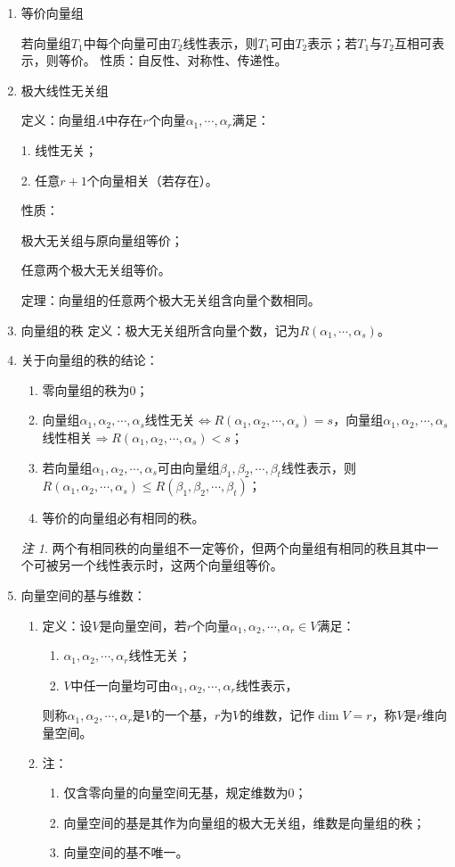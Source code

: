 \documentclass[UTF8]{ctexart}
\theoremstyle{remark}
\newtheorem{remark}{注}
\begin{document}
\begin{enumerate}
\item 等价向量组  

若向量组\(T_1\)中每个向量可由\(T_2\)线性表示，则\(T_1\)可由\(T_2\)表示；若\(T_1\)与\(T_2\)互相可表示，则等价。  
性质：自反性、对称性、传递性。  

\item 极大线性无关组  

定义：向量组\(A\)中存在\(r\)个向量\(\alpha_1,\cdots,\alpha_r\)满足： 
 
1. 线性无关；  

2. 任意\(r+1\)个向量相关（若存在）。  

性质：  

极大无关组与原向量组等价；  

任意两个极大无关组等价。  

定理：向量组的任意两个极大无关组含向量个数相同。  

\item 向量组的秩  
定义：极大无关组所含向量个数，记为\(R(\alpha_1,\cdots,\alpha_s)\)。

\item 关于向量组的秩的结论：
\begin{enumerate}
	\item 零向量组的秩为0；
	\item 向量组$\alpha_1,\alpha_2,\cdots,\alpha_s$线性无关$\Leftrightarrow R(\alpha_1,\alpha_2,\cdots,\alpha_s)=s$，向量组$\alpha_1,\alpha_2,\cdots,\alpha_s$线性相关$\Rightarrow R(\alpha_1,\alpha_2,\cdots,\alpha_s)<s$；
	\item 若向量组$\alpha_1,\alpha_2,\cdots,\alpha_s$可由向量组$\beta_1,\beta_2,\cdots,\beta_t$线性表示，则$R(\alpha_1,\alpha_2,\cdots,\alpha_s)\leq R(\beta_1,\beta_2,\cdots,\beta_t)$；
	\item 等价的向量组必有相同的秩。
\end{enumerate}
\begin{remark}
	两个有相同秩的向量组不一定等价，但两个向量组有相同的秩且其中一个可被另一个线性表示时，这两个向量组等价。
\end{remark}

\item 向量空间的基与维数：
\begin{enumerate}
	\item 定义：设$V$是向量空间，若$r$个向量$\alpha_1,\alpha_2,\cdots,\alpha_r\in V$满足：
	\begin{enumerate}
		\item $\alpha_1,\alpha_2,\cdots,\alpha_r$线性无关；
		\item $V$中任一向量均可由$\alpha_1,\alpha_2,\cdots,\alpha_r$线性表示，
	\end{enumerate}
	则称$\alpha_1,\alpha_2,\cdots,\alpha_r$是$V$的一个基，$r$为$V$的维数，记作$\dim V=r$，称$V$是$r$维向量空间。
	\item 注：
	\begin{enumerate}
		\item 仅含零向量的向量空间无基，规定维数为0；
		\item 向量空间的基是其作为向量组的极大无关组，维数是向量组的秩；
		\item 向量空间的基不唯一。
	\end{enumerate}
\end{enumerate}


\end{enumerate}
\end{document}
